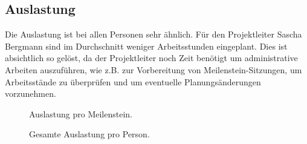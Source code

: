 \subsection{Auslastung}
Die Auslastung ist bei allen Personen sehr ähnlich. Für den Projektleiter Sascha Bergmann sind im Durchschnitt weniger Arbeitsstunden eingeplant. Dies ist absichtlich so gelöst, da der Projektleiter noch Zeit benötigt um administrative Arbeiten auszuführen, wie z.B. zur Vorbereitung von Meilenstein-Sitzungen, um Arbeitsstände zu überprüfen und um eventuelle Planungsänderungen vorzunehmen.

\begin{figure}[H]
\centering

\caption{Auslastung pro Meilenstein.}
\end{figure}



\begin{figure}[H]
\centering

\caption{Gesamte Auslastung pro Person.}
\end{figure}

